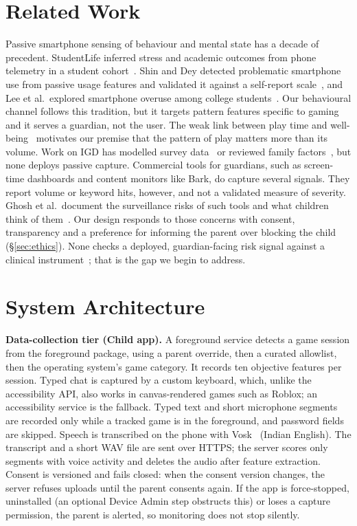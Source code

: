 \documentclass[conference]{IEEEtran}
\begin{document}
\section{Related Work}\label{sec:related}
Passive smartphone sensing of behaviour and mental state has a decade of precedent.
StudentLife inferred stress and academic outcomes from phone telemetry in a student
cohort~\cite{studentlife2014}. Shin and Dey detected problematic smartphone use from
passive usage features and validated it against a self-report scale~\cite{shin2013},
and Lee et al.\ explored smartphone overuse among college students~\cite{lee2014}. Our
behavioural channel follows this tradition, but it targets pattern features specific to
gaming and it serves a guardian, not the user. The weak link between play time and
well-being~\cite{johannes2021,vuorre2022} motivates our premise that the pattern of
play matters more than its volume. Work on IGD has modelled survey
data~\cite{huang2024,strojny2024} or reviewed family factors~\cite{ergin2025}, but none
deploys passive capture. Commercial tools for guardians, such as screen-time dashboards
and content monitors like Bark, do capture several signals. They report volume or
keyword hits, however, and not a validated measure of severity. Ghosh et al.\ document
the surveillance risks of such tools and what children think of
them~\cite{ghosh2018}. Our design responds to those concerns with consent, transparency
and a preference for informing the parent over blocking the child
(\S\ref{sec:ethics}). None checks a deployed, guardian-facing risk signal against a
clinical instrument~\cite{igds9sf}; that is the gap we begin to address.

\section{System Architecture}
\textbf{Data-collection tier (Child app).} A foreground service detects a game session
from the foreground package, using a parent override, then a curated allowlist, then
the operating system's game category. It records ten objective features per session.
Typed chat is captured by a custom keyboard, which, unlike the accessibility API, also
works in canvas-rendered games such as Roblox; an accessibility service is the
fallback. Typed text and short microphone segments are recorded only while a tracked
game is in the foreground, and password fields are skipped. Speech is transcribed on
the phone with Vosk~\cite{vosk} (Indian English). The transcript and a short WAV file
are sent over HTTPS; the server scores only segments with voice activity and deletes
the audio after feature extraction. Consent is versioned and fails closed: when the
consent version changes, the server refuses uploads until the parent consents again. If
the app is force-stopped, uninstalled (an optional Device Admin step obstructs this) or
loses a capture permission, the parent is alerted, so monitoring does not stop silently.
\end{document}
